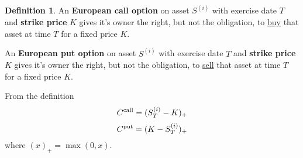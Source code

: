 \documentclass[a4paper,12pt, oneside]{book}
\theoremstyle{definition}
\newtheorem{mydef}{Definition}[section]
\theoremstyle{remark}
\begin{document}
\begin{mydef}
 An \textbf{European call option} on asset $S^{(i)}$ with exercise date $T$ and \textbf{strike price} $K$ gives it's owner the right, but not the obligation, to \underline{buy} that asset at time $T$ for a fixed price $K$.
 
 An \textbf{European put option} on asset $S^{(i)}$ with exercise date $T$ and \textbf{strike price} $K$ gives it's owner the right, but not the obligation, to \underline{sell} that asset at time $T$ for a fixed price $K$.
\end{mydef}
From the definition
\begin{equation}
 \label{eq:ecall}
 C\textsuperscript{call} = (S^{(i)}_T - K)_+
\end{equation}
\begin{equation}
 \label{eq:eput}
 C\textsuperscript{put} = (K - S^{(i)}_T )_+
\end{equation}
where $(x)_+ = \max(0,x)$.
\end{document}
